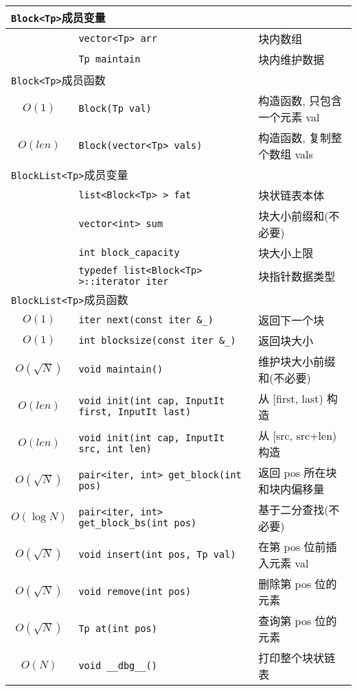 \begin{longtable}{c|l|l} \hline\hline
\multicolumn{3}{l}{{\tt Block<Tp>}成员变量} \\ \hline
& \verb`vector<Tp> arr` & 块内数组 \\
& \verb`Tp maintain` & 块内维护数据 \\
\hline
\multicolumn{3}{l}{{\tt Block<Tp>}成员函数} \\ \hline
$O(1)$ & \verb`Block(Tp val)` & 构造函数, 只包含一个元素 val \\
$O(len)$ & \verb`Block(vector<Tp> vals)` & 构造函数, 复制整个数组 vals \\
\hline
\multicolumn{3}{l}{{\tt BlockList<Tp>}成员变量} \\ \hline
& \verb`list<Block<Tp> > fat` & 块状链表本体 \\
& \verb`vector<int> sum` & 块大小前缀和(不必要) \\
& \verb`int block_capacity` & 块大小上限 \\
& \verb`typedef list<Block<Tp> >::iterator iter` & 块指针数据类型 \\
\hline
\multicolumn{3}{l}{{\tt BlockList<Tp>}成员函数} \\ \hline
$O(1)$ & \verb`iter next(const iter &_)` & 返回下一个块 \\
$O(1)$ & \verb`int blocksize(const iter &_) ` & 返回块大小 \\
$O(\sqrt{N})$ & \verb`void maintain()` & 维护块大小前缀和(不必要) \\
$O(len)$ & \verb`void init(int cap, InputIt first, InputIt last)` & 从 [first, last) 构造 \\
$O(len)$ & \verb`void init(int cap, InputIt src, int len)` & 从 [src, src+len) 构造\\
$O(\sqrt{N})$ & \verb`pair<iter, int> get_block(int pos)` & 返回 pos 所在块和块内偏移量 \\
$O(\log N)$ & \verb`pair<iter, int> get_block_bs(int pos)` & 基于二分查找(不必要) \\
$O(\sqrt{N})$ & \verb`void insert(int pos, Tp val)` & 在第 pos 位前插入元素 val \\
$O(\sqrt{N})$ & \verb`void remove(int pos)` & 删除第 pos 位的元素 \\
$O(\sqrt{N})$ & \verb`Tp at(int pos)` & 查询第 pos 位的元素 \\
$O(N)$ & \verb`void __dbg__()` & 打印整个块状链表 \\
\hline\hline
\end{longtable}


